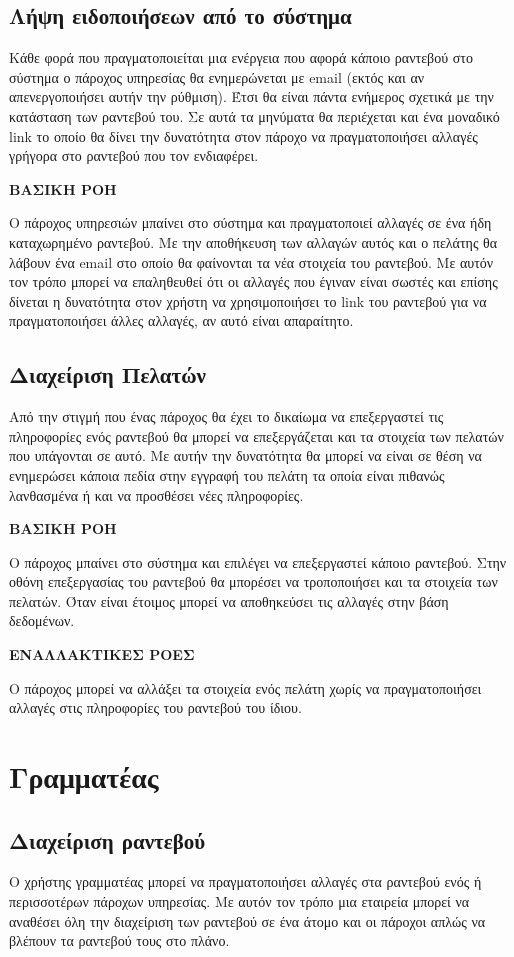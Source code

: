 \subsection{Λήψη ειδοποιήσεων από το σύστημα}
Κάθε φορά που πραγματοποιείται μια ενέργεια που αφορά κάποιο ραντεβού στο σύστημα ο πάροχος υπηρεσίας θα ενημερώνεται με email (εκτός και αν απενεργοποιήσει αυτήν την ρύθμιση). Έτσι θα είναι πάντα ενήμερος σχετικά με την κατάσταση των ραντεβού του. Σε αυτά τα μηνύματα θα περιέχεται και ένα μοναδικό link το οποίο θα δίνει την δυνατότητα στον πάροχο να πραγματοποιήσει αλλαγές γρήγορα στο ραντεβού που τον ενδιαφέρει.

\textbf{ΒΑΣΙΚΗ ΡΟΗ}

Ο πάροχος υπηρεσιών μπαίνει στο σύστημα και πραγματοποιεί αλλαγές σε ένα ήδη καταχωρημένο ραντεβού. Με την αποθήκευση των αλλαγών αυτός και ο πελάτης θα λάβουν ένα email στο οποίο θα φαίνονται τα νέα στοιχεία του ραντεβού. Με αυτόν τον τρόπο μπορεί να επαληθευθεί ότι οι αλλαγές που έγιναν είναι σωστές και επίσης δίνεται η δυνατότητα στον χρήστη να χρησιμοποιήσει το link του ραντεβού για να πραγματοποιήσει άλλες αλλαγές, αν αυτό είναι απαραίτητο.

\subsection {Διαχείριση Πελατών}
Από την στιγμή που ένας πάροχος θα έχει το δικαίωμα να επεξεργαστεί τις πληροφορίες ενός ραντεβού θα μπορεί να επεξεργάζεται και τα στοιχεία των πελατών που υπάγονται σε αυτό. Με αυτήν την δυνατότητα θα μπορεί να είναι σε θέση να ενημερώσει κάποια πεδία στην εγγραφή του πελάτη τα οποία είναι πιθανώς λανθασμένα ή και να προσθέσει νέες πληροφορίες.

\textbf{ΒΑΣΙΚΗ ΡΟΗ}

Ο πάροχος μπαίνει στο σύστημα και επιλέγει να επεξεργαστεί κάποιο ραντεβού. Στην οθόνη επεξεργασίας του ραντεβού θα μπορέσει να τροποποιήσει και τα στοιχεία των πελατών. Όταν είναι έτοιμος μπορεί να αποθηκεύσει τις αλλαγές στην βάση δεδομένων.

\textbf{ΕΝΑΛΛΑΚΤΙΚΕΣ ΡΟΕΣ}

Ο πάροχος μπορεί να αλλάξει τα στοιχεία ενός πελάτη χωρίς να πραγματοποιήσει αλλαγές στις πληροφορίες του ραντεβού του ίδιου.

\section{Γραμματέας}
\subsection{Διαχείριση ραντεβού}
Ο χρήστης γραμματέας μπορεί να πραγματοποιήσει αλλαγές στα ραντεβού ενός ή περισσοτέρων πάροχων υπηρεσίας. Με αυτόν τον τρόπο μια εταιρεία μπορεί να αναθέσει όλη την διαχείριση των ραντεβού σε ένα άτομο και οι πάροχοι απλώς να βλέπουν τα ραντεβού τους στο πλάνο.

